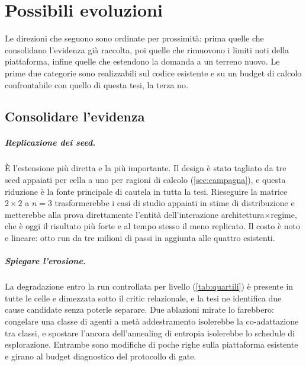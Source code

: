 \chapter{Possibili evoluzioni}
\label{ch:evoluzioni}

Le direzioni che seguono sono ordinate per prossimità: prima quelle che
consolidano l'evidenza già raccolta, poi quelle che rimuovono i limiti
noti della piattaforma, infine quelle che estendono la domanda a un
terreno nuovo. Le prime due categorie sono realizzabili sul codice
esistente e su un budget di calcolo confrontabile con quello di questa
tesi, la terza no.

\section{Consolidare l'evidenza}
\label{sec:evo-evidenza}

\paragraph{Replicazione dei seed.}
È l'estensione più diretta e la più importante. Il design è stato
tagliato da tre seed appaiati per cella a uno per ragioni di calcolo
(\cref{sec:campagna}), e questa riduzione è la fonte principale di
cautela in tutta la tesi. Rieseguire la matrice $2\times2$ a $n{=}3$
trasformerebbe i casi di studio appaiati in stime di distribuzione e
metterebbe alla prova direttamente l'entità dell'interazione
architettura$\times$regime, che è oggi il risultato più forte e al tempo
stesso il meno replicato. Il costo è noto e lineare: otto run da tre
milioni di passi in aggiunta alle quattro esistenti.

\paragraph{Spiegare l'erosione.}
La degradazione entro la run controllata per livello
(\cref{tab:quartili}) è presente in tutte le celle e dimezzata sotto il
critic relazionale, e la tesi ne identifica due cause candidate senza
poterle separare. Due ablazioni mirate lo farebbero: congelare una
classe di agenti a metà addestramento isolerebbe la co-adattazione tra
classi, e spostare l'ancora dell'annealing di entropia isolerebbe lo
schedule di esplorazione. Entrambe sono modifiche di poche righe sulla
piattaforma esistente e girano al budget diagnostico del protocollo di
gate.

